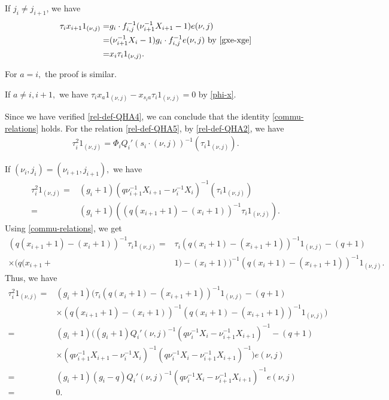 \documentclass[11pt, reqno]{amsart} \textwidth=14.9cm \oddsidemargin=1cm \evensidemargin=1cm
\theoremstyle{definition}
\numberwithin{equation}{section}
\begin{document}
If $j_{i}\neq j_{i+1}$, we have
\begin{align*}
\tau_{i}x_{i+1}1_{(\nu, j)}=&g_{i}\cdot f_{i, j}^{-1}(\nu_{i+1}^{-1}X_{i+1}-1)e(\nu, j)\\
=&(\nu_{i+1}^{-1}X_{i}-1)g_{i}\cdot f_{i, j}^{-1}e(\nu, j)\text{ by }\eqref{gxe-xge}\\
=&x_{i}\tau_{i}1_{(\nu, j)}.
\end{align*}

For $a=i,$ the proof is similar.

If $a\neq i, i+1,$ we have $\tau_{i}x_{a}1_{(\nu, j)}-x_{s_{i}a}\tau_{i}1_{(\nu, j)}=0$ by \eqref{phi-x}.

Since we have verified \eqref{rel-def-QHA4}, we can conclude that the identity \eqref{commu-relations} holds. For the relation \eqref{rel-def-QHA5}, by \eqref{rel-def-QHA2}, we have
\begin{align*}
\tau_{i}^{2}1_{(\nu, j)}=\Phi_{i}Q_{i}'(s_{i}\cdot(\nu, j))^{-1}(\tau_{i}1_{(\nu, j)}).
\end{align*}

If $(\nu_{i}, j_{i})=(\nu_{i+1}, j_{i+1}),$ we have
\begin{align*}
\tau_{i}^{2}1_{(\nu, j)}=&(g_{i}+1)(q\nu_{i+1}^{-1}X_{i+1}-\nu_{i}^{-1}X_{i})^{-1}(\tau_{i}1_{(\nu, j)})\\
=&(g_{i}+1)((q(x_{i+1}+1)-(x_{i}+1))^{-1}\tau_{i}1_{(\nu, j)}).
\end{align*}
Using \eqref{commu-relations}, we get
\begin{align*}
(q(x_{i+1}+1)-(x_{i}+1))^{-1}\tau_{i}1_{(\nu, j)}=&\tau_{i}(q(x_{i}+1)-(x_{i+1}+1))^{-1}1_{(\nu, j)}
-(q+1)\\\times(q(x_{i+1}+&1)-(x_{i}+1))^{-1}(q(x_{i}+1)-(x_{i+1}+1))^{-1}1_{(\nu, j)}.
\end{align*}
Thus, we have
\begin{align*}
\tau_{i}^{2}1_{(\nu, j)}=&(g_{i}+1)(\tau_{i}(q(x_{i}+1)-(x_{i+1}+1))^{-1}1_{(\nu, j)}
-(q+1)\\&\times(q(x_{i+1}+1)-(x_{i}+1))^{-1}(q(x_{i}+1)-(x_{i+1}+1))^{-1}1_{(\nu, j)})\\
=&(g_{i}+1)((g_{i}+1)Q_{i}'(\nu, j)^{-1}(q\nu_{i}^{-1}X_{i}-\nu_{i+1}^{-1}X_{i+1})^{-1}-(q+1)\\
&\times(q\nu_{i+1}^{-1}X_{i+1}-
\nu_{i}^{-1}X_{i})^{-1}(q\nu_{i}^{-1}X_{i}-\nu_{i+1}^{-1}X_{i+1})^{-1})e(\nu, j)\\
=&(g_{i}+1)(g_{i}-q)Q_{i}'(\nu, j)^{-1}(q\nu_{i}^{-1}X_{i}-\nu_{i+1}^{-1}X_{i+1})^{-1}e(\nu, j)\\
=&0.
\end{align*}
\end{document}
